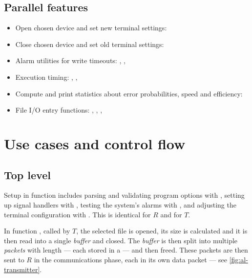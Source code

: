 \documentclass[main.tex]{subfiles}
\begin{document}
\subsection{Parallel features}
\label{subsec:parallelarch}

\begin{itemize}[noitemsep,rightmargin=3em]
\item Open chosen device and set new terminal settings:

\item Close chosen device and set old terminal settings:

\item Alarm utilities for write timeouts:
, , 

\item Execution timing:
, , 

\item Compute and print statistics about error probabilities, speed and efficiency:

\item File I/O entry functions:
, , , 
\end{itemize}

\section{Use cases and control flow}
\label{sec:usecases}

\subsection{Top level}
\label{subsec:topusecases}

Setup in function  includes parsing and validating program options with , setting up signal handlers with , testing the system's alarms with , and adjusting the terminal configuration with .
This is identical for $R$ and for $T$.

In function , called by $T$, the selected file is opened, its size is calculated and it is then read into a single \emph{buffer} and closed.
The \emph{buffer} is then split into multiple \emph{packets} with length  --- each stored in a  --- and then freed.
These packets are then sent to $R$ in the communications phase, each in its own data packet --- see \autoref{fig:al-transmitter}.
\end{document}
